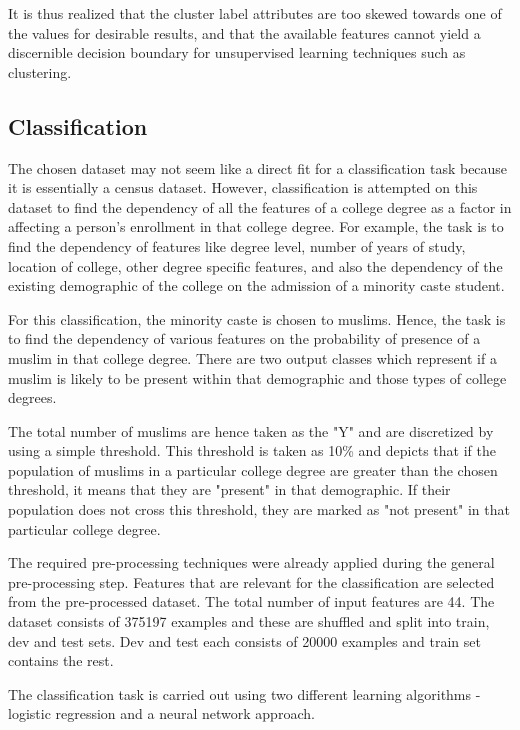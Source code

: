 It is thus realized that the cluster label attributes are too skewed towards one of the values for desirable results, and that the available features cannot yield a discernible decision boundary for unsupervised learning techniques such as clustering. 


\subsection{Classification}

The chosen dataset may not seem like a direct fit for a classification task because it is essentially a census dataset. However, classification is attempted on this dataset to find the dependency of all the features of a college degree as a factor in affecting a person's enrollment in that college degree. For example, the task is to find the dependency of features like degree level, number of years of study, location of college, other degree specific features, and also the dependency of the existing demographic of the college on the admission of a minority caste student.

For this classification, the minority caste is chosen to muslims. Hence, the task is to find the dependency of various features on the probability of presence of a muslim in that college degree. There are two output classes which represent if a muslim is likely to be present within that demographic and those types of college degrees. 

The total number of muslims are hence taken as the "Y" and are discretized by using a simple threshold. This threshold is taken as 10\% and depicts that if the population of muslims in a particular college degree are greater than the chosen threshold, it means that they are "present" in that demographic. If their population does not cross this threshold, they are marked as "not present" in that particular college degree.

The required pre-processing techniques were already applied during the general pre-processing step. Features that are relevant for the classification are selected from the pre-processed dataset. The total number of input features are 44. The dataset consists of 375197 examples and these are shuffled and split into train, dev and test sets. Dev and test each consists of 20000 examples and train set contains the rest.

The classification task is carried out using two different learning algorithms - logistic regression and a neural network approach. 


